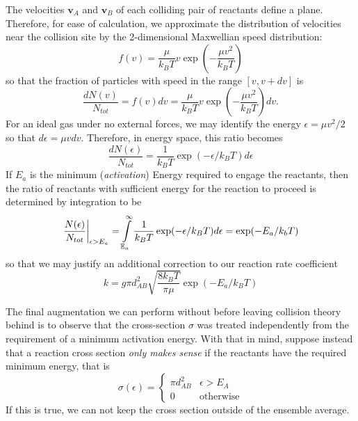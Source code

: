 The velocities $\mathbf{v}_{A}$ and $\mathbf{v}_{B}$ of each colliding pair of reactants define a plane. Therefore, for ease of calculation, we approximate the distribution of velocities near the collision site by the 2-dimensional Maxwellian speed distribution:
\begin{equation}
  f(v) = \frac{\mu}{k_BT}v\exp\left(-\frac{\mu v^2}{k_BT}\right)
\end{equation}
so that the fraction of particles with speed in the range $[v, v+dv]$ is
\begin{equation}
  \frac{dN(v)}{N_{tot}} = f(v)dv = \frac{\mu}{k_BT}v\exp\left(-\frac{\mu v^2}{k_BT}\right)dv.
\end{equation}
For an ideal gas under no external forces, we may identify the energy $\epsilon = \mu v^2/2$ so that $d\epsilon = \mu vdv$. Therefore, in energy space, this ratio becomes
\begin{equation}
  \frac{dN(\epsilon)}{N_{tot}} = \frac{1}{k_BT}\exp(-\epsilon/k_BT)d\epsilon
\end{equation}
If $E_a$ is the minimum (\textit{activation}) Energy required to engage the reactants, then the ratio of reactants with sufficient energy for the reaction to proceed is determined by integration to be
\begin{equation}
  \left.\frac{N(\epsilon)}{N_{tot}}\right\rvert_{\epsilon > E_{a}} = \int\limits_{\mathbb{E}_{a}}^{\infty}\frac{1}{k_BT}\exp(-\epsilon/k_BT)d\epsilon = \exp(-E_a/k_bT)
\end{equation}
so that we may justify an additional correction to our reaction rate coefficient
\begin{equation}
  k = g\pi d_{AB}^2\sqrt{\frac{8k_BT}{\pi \mu}}\exp(-E_{a}/k_BT)
\end{equation}

The final augmentation we can perform without before leaving collision theory behind is to observe that the cross-section $\sigma$ was treated independently from the requirement of a minimum activation energy. With that in mind, suppose instead that a reaction cross section \textit{only makes sense} if the reactants have the required minimum energy, that is
\begin{equation}
  \sigma(\epsilon) = \begin{cases}
    \pi d_{AB}^2 & \epsilon > E_{A} \\
    0 & \text{otherwise}
  \end{cases}
\end{equation}
If this is true, we can not keep the cross section outside of the ensemble average.

